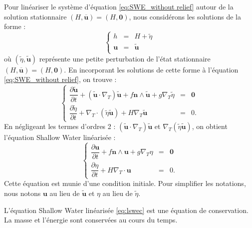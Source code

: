 Pour linéariser le système d'équation \eqref{eq:SWE_without relief} autour de la solution stationnaire $(H, \overline{\mathbf{u}}) = (H,\mathbf{0})$, nous considérons les solutions de la forme :
\begin{equation}
\left\lbrace
\begin{array}{rcl}
h & = & H + \tilde{\eta} \\
\mathbf{u} & = & \tilde{\mathbf{u}} \\
\end{array}
\right.
\end{equation}
où $(\tilde{\eta}, \tilde{\mathbf{u}})$ représente une petite perturbation de l'état stationnaire  $(H, \overline{\mathbf{u}}) = (H,\mathbf{0})$.
En incorporant les solutions de cette forme à l'équation \eqref{eq:SWE_without relief}, on trouve :
\begin{equation}
\left\lbrace
\begin{array}{rcl}
\dfrac{\partial \tilde{\mathbf{u}}}{\partial t} + \left( \tilde{\mathbf{u}} \cdot \nabla_T \right) \tilde{\mathbf{u}} + f \mathbf{n} \wedge \tilde{\mathbf{u}} + g \nabla_T \tilde{\eta} & = & \mathbf{0} \\
\dfrac{\partial \tilde{\eta}}{\partial t} + \nabla_T \cdot \left( \tilde{\eta} \tilde{\mathbf{u}} \right) + H \nabla_T \tilde{\mathbf{u}} & = & 0.
\end{array}
\right.
\end{equation}
En négligeant les termes d'ordres 2 : $(\tilde{\mathbf{u}} \cdot \nabla_T ) \tilde{\mathbf{u}}$ et $\nabla_T (\tilde{\eta} \tilde{\mathbf{u}})$, on obtient l'équation Shallow Water linéarisée :
\begin{equation}
\left\lbrace
\begin{array}{rcl}
\dfrac{\partial \mathbf{u}}{\partial t} + f \mathbf{n} \wedge \mathbf{u} + g \nabla_T \eta & = & \mathbf{0} \\
\dfrac{\partial \eta}{\partial t} +  H \nabla_T \cdot \mathbf{u} & = & 0.
\end{array}
\right.
\label{eq:lswec}
\end{equation}
Cette équation est munie d'une condition initiale.
Pour simplifier les notations, nous notons $\mathbf{u}$ au lieu de $\tilde{\mathbf{u}}$ et $\eta$ au lieu de $\tilde{\eta}$.

L'équation Shallow Water linéarisée \eqref{eq:lswec} est une équation de conservation. La masse et l'énergie sont conservées au cours du temps.

